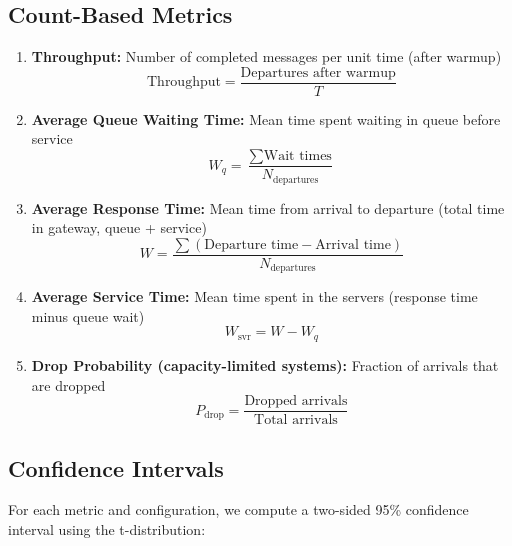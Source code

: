 \documentclass[12pt]{article}
\begin{document}
\subsection{Count-Based Metrics}

\begin{enumerate}
    \item \textbf{Throughput:} Number of completed messages per unit time (after warmup)
          \begin{equation}
              \text{Throughput} = \frac{\text{Departures after warmup}}{T}
          \end{equation}

    \item \textbf{Average Queue Waiting Time:} Mean time spent waiting in queue before service
          \begin{equation}
              W_q = \frac{\sum \text{Wait times}}{N_{\text{departures}}}
          \end{equation}

    \item \textbf{Average Response Time:} Mean time from arrival to departure (total time in gateway, queue + service)
          \begin{equation}
              W = \frac{\sum (\text{Departure time} - \text{Arrival time})}{N_{\text{departures}}}
          \end{equation}

    \item \textbf{Average Service Time:} Mean time spent in the servers (response time minus queue wait)
          \begin{equation}
              W_{\text{svr}} = W - W_q
          \end{equation}

    \item \textbf{Drop Probability (capacity-limited systems):} Fraction of arrivals that are dropped
          \begin{equation}
              P_{\text{drop}} = \frac{\text{Dropped arrivals}}{\text{Total arrivals}}
          \end{equation}
\end{enumerate}

\subsection{Confidence Intervals}

For each metric and configuration, we compute a two-sided 95\% confidence interval using the t-distribution:
\end{document}
